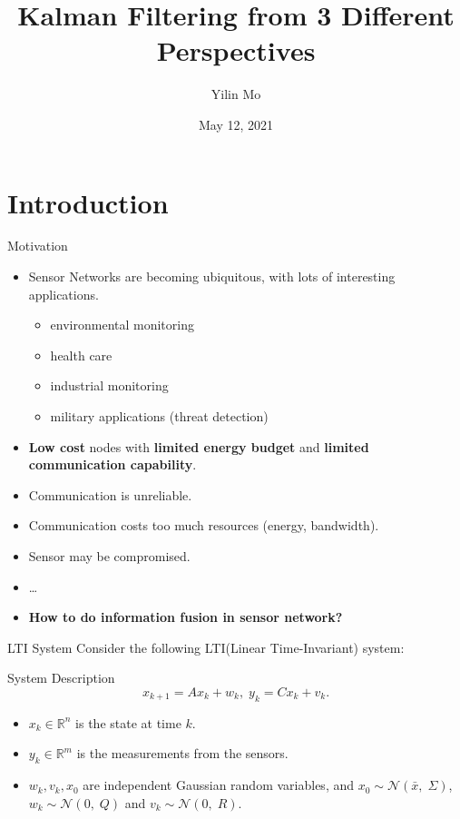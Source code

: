 \documentclass[10pt]{beamer}
\title[Kalman Filter]{Kalman Filtering from 3 Different Perspectives}
\author[Yilin Mo]{Yilin Mo}
\institute[Tsinghua]{Department of Automation, Tsinghua University}
\date[May 12, 2021]{May 12, 2021}
\DeclareMathOperator{\1}{\textbf{1}}
\begin{document}
\begin{frame}
  \titlepage
\end{frame}

\frame{\tableofcontents}

\section{Introduction}
\begin{frame}{Motivation}
  \begin{itemize}
    \item Sensor Networks are becoming ubiquitous, with lots of interesting applications.
      \begin{itemize}
	\item environmental monitoring
	\item health care
	\item industrial monitoring
	\item military applications (threat detection)
      \end{itemize}
    \item {\bf Low cost} nodes with {\bf limited energy budget} and {\bf limited communication capability}.
    \item Communication is unreliable. 
    \item Communication costs too much resources (energy, bandwidth). 
    \item Sensor may be compromised.
    \item \ldots
    \item \bf How to do information fusion in sensor network?
  \end{itemize}
\end{frame}

\begin{frame}{LTI System}
  Consider the following LTI(Linear Time-Invariant) system:
  \begin{block}{System Description}
    \begin{displaymath}
      x_{k+1} = Ax_k +  w_k,\; y_{k} = C x_k + v_k.
    \end{displaymath}
  \end{block}
  \begin{itemize}
    \item $x_k \in \mathbb R^n$ is the state at time $k$.
    \item  $y_k \in \mathbb R^m$ is the measurements from the sensors. 
    \item $w_k,v_k,x_0$ are independent Gaussian random variables, and $x_0 \sim \mathcal N(\bar x,\;\Sigma)$, $w_k \sim \mathcal N(0,\;Q)$ and $v_k \sim \mathcal N(0,\;R)$. 
  \end{itemize}
\end{frame}
\end{document}
